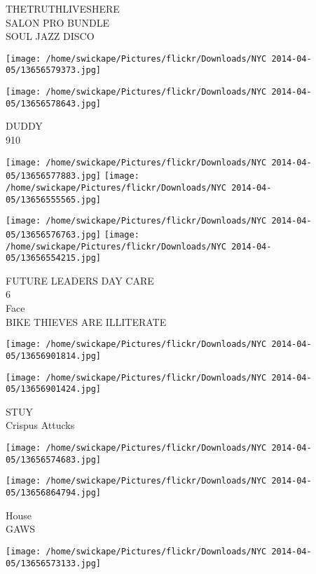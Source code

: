 \documentclass[10pt,letterpaper]{article}
\begin{document}
THETRUTHLIVESHERE\\
SALON PRO BUNDLE\\
SOUL JAZZ DISCO\\
\pagebreak

\texttt{[image: /home/swickape/Pictures/flickr/Downloads/NYC 2014-04-05/13656579373.jpg]}

\vspace{0.25in}
\texttt{[image: /home/swickape/Pictures/flickr/Downloads/NYC 2014-04-05/13656578643.jpg]}

DUDDY\\
910\\
\pagebreak

\texttt{[image: /home/swickape/Pictures/flickr/Downloads/NYC 2014-04-05/13656577883.jpg]}
\texttt{[image: /home/swickape/Pictures/flickr/Downloads/NYC 2014-04-05/13656555565.jpg]}

\texttt{[image: /home/swickape/Pictures/flickr/Downloads/NYC 2014-04-05/13656576763.jpg]}
\texttt{[image: /home/swickape/Pictures/flickr/Downloads/NYC 2014-04-05/13656554215.jpg]}

FUTURE LEADERS DAY CARE\\
6\\
Face\\
BIKE THIEVES ARE ILLITERATE\\
\pagebreak

\texttt{[image: /home/swickape/Pictures/flickr/Downloads/NYC 2014-04-05/13656901814.jpg]}

\vspace{0.25in}
\texttt{[image: /home/swickape/Pictures/flickr/Downloads/NYC 2014-04-05/13656901424.jpg]}

STUY\\
Crispus Attucks\\
\pagebreak

\texttt{[image: /home/swickape/Pictures/flickr/Downloads/NYC 2014-04-05/13656574683.jpg]}

\vspace{0.25in}
\texttt{[image: /home/swickape/Pictures/flickr/Downloads/NYC 2014-04-05/13656864794.jpg]}

House\\
GAWS\\
\pagebreak

\texttt{[image: /home/swickape/Pictures/flickr/Downloads/NYC 2014-04-05/13656573133.jpg]}
\end{document}
